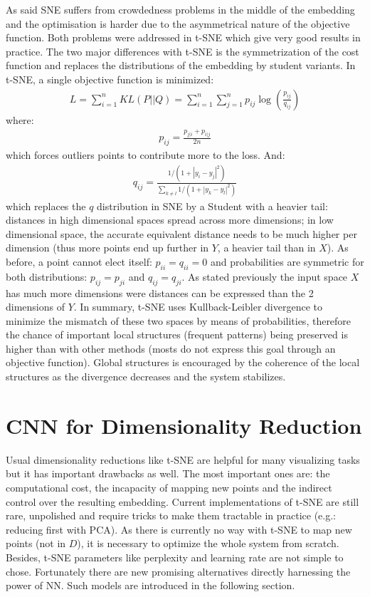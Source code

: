 \documentclass[a4paper,12pt]{report}
\newcommand{\eg}{e.g.}
\begin{document}
As said SNE suffers from crowdedness problems in the middle of the embedding and the optimisation is harder due to the asymmetrical nature of the objective function.
Both problems were addressed in t-SNE which give very good results in practice.
The two major differences with t-SNE is the symmetrization of the cost function and replaces the distributions of the embedding by student variants.
In t-SNE, a single objective function is minimized:
\begin{eqnarray}
    L = \sum_{i=1}^n KL(P || Q) = \sum_{i=1}^n \sum_{j=1}^n p_{ij} \log\left(\frac{p_{ij}}{q_{ij}}\right)
\end{eqnarray}
where:
\begin{eqnarray}
    p_{ij} = \frac{p_{j|i} + p_{i|j}}{2 n}
\end{eqnarray}
which forces outliers points to contribute more to the loss.
And:
\begin{eqnarray}
    q_{ij} = \frac{1 / (1 + |y_i - y_j|^2)}{\sum_{k \not = l} 1/(1 + |y_k - y_l|^2)}
\end{eqnarray}
which replaces the $q$ distribution in SNE by a Student with a heavier tail: distances in high dimensional spaces spread across more dimensions; in low dimensional space, the accurate equivalent distance needs to be much higher per dimension (thus more points end up further in $Y$, a heavier tail than in $X$).
As before, a point cannot elect itself: $p_{ii} = q_{ii} = 0$ and probabilities are symmetric for both distributions: $p_{ij} = p_{ji}$ and $q_{ij} = q_{ji}$.
As stated previously the input space $X$ has much more dimensions were distances can be expressed than the 2 dimensions of $Y$.
In summary, t-SNE uses Kullback-Leibler divergence to minimize the mismatch of these two spaces by means of probabilities, therefore the chance of important local structures (frequent patterns) being preserved is higher than with other methods (mosts do not express this goal through an objective function).
Global structures is encouraged by the coherence of the local structures as the divergence decreases and the system stabilizes.

\section{CNN for Dimensionality Reduction}
Usual dimensionality reductions like t-SNE are helpful for many visualizing tasks but it has important drawbacks as well.
The most important ones are: the computational cost, the incapacity of mapping new points and the indirect control over the resulting embedding.
Current implementations of t-SNE are still rare, unpolished and require tricks to make them tractable in practice (\eg: reducing first with PCA).
As there is currently no way with t-SNE to map new points (not in $D$), it is necessary to optimize the whole system from scratch.
Besides, t-SNE parameters like perplexity and learning rate are not simple to chose.
Fortunately there are new promising alternatives directly harnessing the power of NN.
Such models are introduced in the following section.
\end{document}
